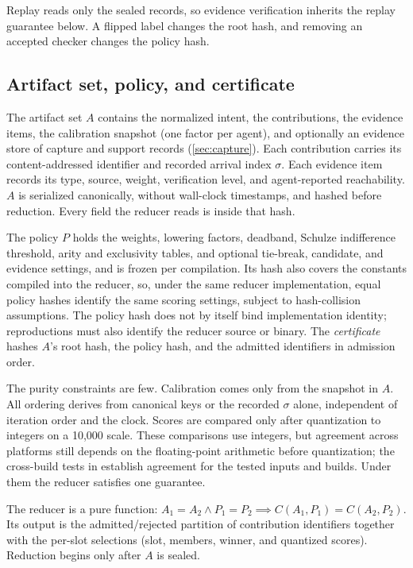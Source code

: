 Replay reads only the sealed records, so evidence verification inherits the replay guarantee below. A flipped label changes the root hash, and removing an accepted checker changes the policy hash.

\subsection{Artifact set, policy, and certificate}
\label{sec:artifact-set}

The artifact set $A$ contains the normalized intent, the contributions, the evidence items, the calibration snapshot (one factor per agent), and optionally an evidence store of capture and support records (\cref{sec:capture}). Each contribution carries its content-addressed identifier and recorded arrival index $\sigma$. Each evidence item records its type, source, weight, verification level, and agent-reported reachability. $A$ is serialized canonically, without wall-clock timestamps, and hashed before reduction. Every field the reducer reads is inside that hash.

The policy $P$ holds the weights, lowering factors, deadband, Schulze indifference threshold, arity and exclusivity tables, and optional tie-break, candidate, and evidence settings, and is frozen per compilation. Its hash also covers the constants compiled into the reducer, so, under the same reducer implementation, equal policy hashes identify the same scoring settings, subject to hash-collision assumptions. The policy hash does not by itself bind implementation identity; reproductions must also identify the reducer source or binary. The \emph{certificate} hashes $A$'s root hash, the policy hash, and the admitted identifiers in admission order.

The purity constraints are few. Calibration comes only from the snapshot in $A$. All ordering derives from canonical keys or the recorded $\sigma$ alone, independent of iteration order and the clock. Scores are compared only after quantization to integers on a 10,000 scale. These comparisons use integers, but agreement across platforms still depends on the floating-point arithmetic before quantization; the cross-build tests in  establish agreement for the tested inputs and builds. Under them the reducer satisfies one guarantee.

\begin{guarantee}[Replay]
\label{guar:replay}
The reducer is a pure function: $A_1 = A_2 \wedge P_1 = P_2 \implies C(A_1, P_1) = C(A_2, P_2)$. Its output is the admitted/rejected partition of contribution identifiers together with the per-slot selections (slot, members, winner, and quantized scores). Reduction begins only after $A$ is sealed.
\end{guarantee}

